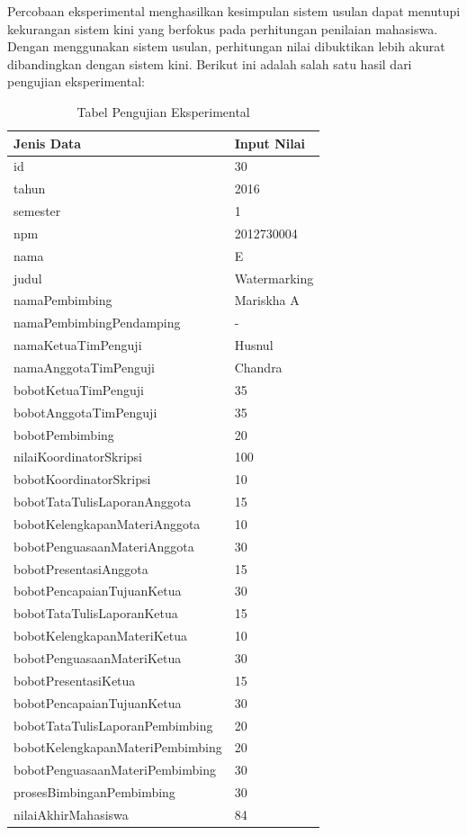 	Percobaan eksperimental menghasilkan kesimpulan sistem usulan dapat menutupi kekurangan sistem kini yang berfokus pada perhitungan penilaian mahasiswa. Dengan menggunakan sistem usulan, perhitungan nilai dibuktikan lebih akurat dibandingkan dengan sistem kini. Berikut ini adalah salah satu hasil dari pengujian eksperimental:
	\begin{table}[htbp]
		\centering
		\caption{Tabel Pengujian Eksperimental}
		\begin{tabular}{| m{7cm} | m{5cm} |}
			\hline
			Jenis Data & Input Nilai\\
			\hline
			id & 30\\
			\hline
			tahun & 2016\\
			\hline
			semester & 1\\
			\hline
			npm & 2012730004\\
			\hline
			nama & E\\
			\hline
			judul & Watermarking\\
			\hline
			namaPembimbing & Mariskha A\\
			\hline
			namaPembimbingPendamping & -\\
			\hline
			namaKetuaTimPenguji & Husnul\\
			\hline
			namaAnggotaTimPenguji & Chandra\\
			\hline
			bobotKetuaTimPenguji & 35\\
			\hline
			bobotAnggotaTimPenguji & 35\\
			\hline
			bobotPembimbing & 20\\
			\hline
			nilaiKoordinatorSkripsi & 100\\
			\hline
			bobotKoordinatorSkripsi & 10\\
			\hline
			bobotTataTulisLaporanAnggota & 15\\
			\hline
			bobotKelengkapanMateriAnggota & 10\\
			\hline
			bobotPenguasaanMateriAnggota & 30\\
			\hline
			bobotPresentasiAnggota & 15\\
			\hline
			bobotPencapaianTujuanKetua & 30\\
			\hline
			bobotTataTulisLaporanKetua & 15\\
			\hline
			bobotKelengkapanMateriKetua & 10\\
			\hline
			bobotPenguasaanMateriKetua & 30\\
			\hline
			bobotPresentasiKetua & 15\\
			\hline
			bobotPencapaianTujuanKetua & 30\\
			\hline
			bobotTataTulisLaporanPembimbing & 20\\
			\hline
			bobotKelengkapanMateriPembimbing &20\\
			\hline
			bobotPenguasaanMateriPembimbing & 30\\
			\hline
			prosesBimbinganPembimbing & 30\\
			\hline
			nilaiAkhirMahasiswa & 84\\
			\hline
		\end{tabular}
	\end{table}
		
